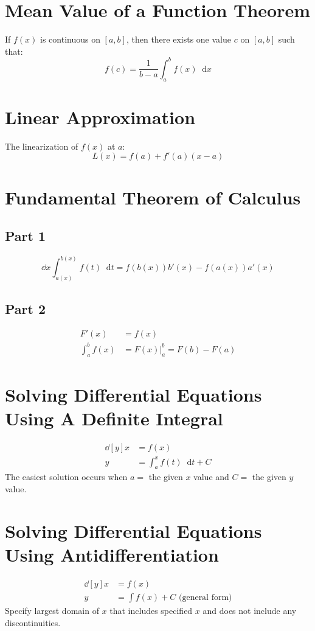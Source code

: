 \documentclass[12pt]{article}
\newcommand*{\D}[1]{\mathop{}\!\mathrm{d}#1}
\newcommand*{\fixmath}{%
  \makebox{}\vspace{\glueexpr-\baselineskip-\abovedisplayskip}}
\newenvironment{fixaskip}{\setlength{\abovedisplayskip}{0pt}\fixmath%
  \ignorespaces}{\ignorespacesafterend}
\newenvironment{fixbskip}{\setlength{\belowdisplayskip}{0pt}\ignorespaces}%
  {\ignorespacesafterend}
\newenvironment{fixskip}{\setlength{\abovedisplayskip}{0pt}%
  \setlength{\belowdisplayskip}{0pt}\fixmath\ignorespaces}%
  {\ignorespacesafterend}
\begin{document}
\section*{Mean Value of a Function Theorem}
If \(f(x)\) is continuous on \([a,b]\), then there exists one value \(c\) on
\([a,b]\) such that:
\begin{fixbskip}
  \[
    f(c) = \frac{1}{b - a} \int_a^b f(x) \D{x}
  \]
\end{fixbskip}
\section*{Linear Approximation}
The linearization of \(f(x)\) at \(a\):
\begin{fixbskip}
  \[
    L(x) = f(a) + f'(a)(x-a)
  \]
\end{fixbskip}
\section*{Fundamental Theorem of Calculus}
\subsection*{Part 1}
\begin{fixskip}
  \[
    \dd{x} \int_{a(x)}^{b(x)} f(t) \D{t} = f(b(x)) b'(x) - f(a(x)) a'(x)
  \]
\end{fixskip}
\subsection*{Part 2}
\begin{fixskip}
  \begin{align*}
    F'(x) &= f(x)\\
    \int_a^b f(x) &= F(x) \bigg|_a^b = F(b) - F(a)
  \end{align*}
\end{fixskip}
\section*{Solving Differential Equations Using A Definite Integral}
\begin{fixaskip}
  \begin{align*}
    \dd[y]{x} &= f(x)\\
    y &= \int_a^x f(t) \D{t} + C
  \end{align*}
\end{fixaskip}
The easiest solution occurs when \(a = \) the given \(x\) value and \(C = \)
the given \(y\) value.
\section*{Solving Differential Equations Using Antidifferentiation}
\begin{fixaskip}
  \begin{align*}
    \dd[y]{x} &= f(x)\\
    y &= \int f(x) + C \text{ (general form)}
  \end{align*}
\end{fixaskip}
Specify largest domain of \(x\) that includes specified \(x\) and does not
include any discontinuities.
\end{document}
